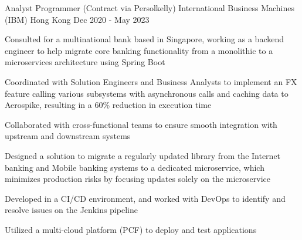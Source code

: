 \begin{cventries}
  \cventry
    {Analyst Programmer (Contract via Persolkelly)}
    {International Business Machines (IBM)}
    {Hong Kong}
    {Dec 2020 - May 2023}
    {
        \begin{cvitems}
          \item {Consulted for a multinational bank based in Singapore, working as a backend engineer to help migrate core banking functionality from a monolithic to a microservices architecture using Spring Boot}
          \item {Coordinated with Solution Engineers and Business Analysts to implement an FX feature calling various subsystems with asynchronous calls and caching data to Aerospike, resulting in a 60\% reduction in execution time}
          \item {Collaborated with cross-functional teams to ensure smooth integration with upstream and downstream systems}
          \item {Designed a solution to migrate a regularly updated library from the Internet banking and Mobile banking systems to a dedicated microservice, which minimizes production risks by focusing updates solely on the microservice}
          \item {Developed in a CI/CD environment, and worked with DevOps to identify and resolve issues on the Jenkins pipeline}
          \item {Utilized a multi-cloud platform (PCF) to deploy and test applications}
        \end{cvitems}
    }
  

\end{cventries}
